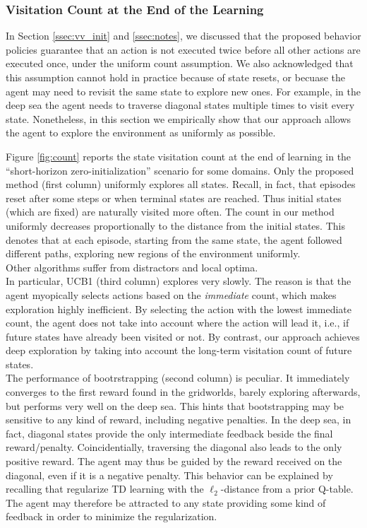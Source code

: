\documentclass{article}
\begin{document}
\subsubsection{Visitation Count at the End of the Learning}
\label{sssec:visit_count_map}
In Section \ref{ssec:vv_init} and \ref{ssec:notes}, we discussed that the proposed behavior policies guarantee that an action is not executed twice before all other actions are executed once, under the uniform count assumption. We also acknowledged that this assumption cannot hold in practice because of state resets, or becuase the agent may need to revisit the same state to explore new ones. For example, in the deep sea the agent needs to traverse diagonal states multiple times to visit every state.
Nonetheless, in this section we empirically show that our approach allows the agent to explore the environment as uniformly as possible. 

Figure \ref{fig:count} reports the state visitation count at the end of learning in the ``short-horizon zero-initialization'' scenario for some domains. 
Only the proposed method (first column) uniformly explores all states. Recall, in fact, that episodes reset after some steps or when terminal states are reached. Thus initial states (which are fixed) are naturally visited more often. The count in our method uniformly decreases proportionally to the distance from the initial states. This denotes that at each episode, starting from the same state, the agent followed different paths, exploring new regions of the environment uniformly. 
\\
Other algorithms suffer from distractors and local optima. 
\\
In particular, UCB1 (third column) explores very slowly. The reason is that the agent myopically selects actions based on the \textit{immediate} count, which makes exploration highly inefficient. By selecting the action with the lowest immediate count, the agent does not take into account where the action will lead it, i.e., if future states have already been visited or not.
By contrast, our approach achieves deep exploration by taking into account the long-term visitation count of future states.
\\
The performance of bootrstrapping (second column) is peculiar. It immediately converges to the first reward found in the gridworlds, barely exploring afterwards, but performs very well on the deep sea. 
This hints that bootstrapping may be sensitive to any kind of reward, including negative penalties. 
In the deep sea, in fact, diagonal states provide the only intermediate feedback beside the final reward/penalty. Coincidentially, traversing the diagonal also leads to the only positive reward.
The agent may thus be guided by the reward received on the diagonal, even if it is a negative penalty.
This behavior can be explained by recalling that \citet{osband2019deep} regularize TD learning with the $\ell_2$-distance from a prior Q-table. The agent may therefore be attracted to any state providing some kind of feedback in order to minimize the regularization. 
\end{document}
